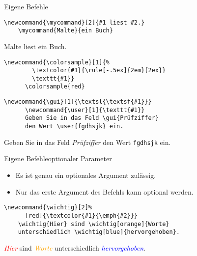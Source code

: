 \begin{Frame}[fragile]{Eigene Befehle}
  \begin{lstlisting}[gobble=4,moretexcs={mycommand}]
    \newcommand{\mycommand}[2]{#1 liest #2.}
    \mycommand{Malte}{ein Buch}
  \end{lstlisting}
  \newcommand{\mycommand}[2]{#1 liest #2.}
  \mycommand{Malte}{ein Buch}

  \xxx\pause

  \begin{Beispiel}
    \begin{lstlisting}[gobble=6,style=block,moretexcs={colorsample}]
      \newcommand{\colorsample}[1]{%
        \textcolor{#1}{\rule[-.5ex]{2em}{2ex}}
        \texttt{#1}}
      \colorsample{red}
    \end{lstlisting}
  \end{Beispiel}

  \pause

  \begin{Beispiel}
    \begin{lstlisting}[gobble=6,style=block,moretexcs={user,gui}]
      \newcommand{\gui}[1]{\textsl{\textsf{#1}}}
      \newcommand{\user}[1]{\texttt{#1}}
      Geben Sie in das Feld \gui{Prüfziffer}
      den Wert \user{fgdhsjk} ein.
    \end{lstlisting}
    \newcommand{\gui}[1]{\textsl{\textsf{#1}}}
    \newcommand{\user}[1]{\texttt{#1}}
    \textrm{Geben Sie in das Feld \gui{Prüfziffer}
    den Wert \user{fgdhsjk} ein.}
  \end{Beispiel}
\end{Frame}

\begin{Frame}[fragile]{Eigene Befehle}{optionaler Parameter}
  \begin{itemize}
    \item Es ist \alert{genau ein} optionales Argument zulässig.
    \item Nur das \alert{erste Argument} des Befehls kann optional werden.
  \end{itemize}

  \xxx

  \begin{lstlisting}[gobble=4,moretexcs={wichtig}]
    \newcommand{\wichtig}[2]%
      [red]{\textcolor{#1}{\emph{#2}}}
    \wichtig{Hier} sind \wichtig[orange]{Worte}
    unterschiedlich \wichtig[blue]{hervorgehoben}.
  \end{lstlisting}
  \newcommand{\wichtig}[2]%
    [red]{\textcolor{#1}{\emph{#2}}}
  \wichtig{Hier} sind \wichtig[orange]{Worte}
  unterschiedlich \wichtig[blue]{hervorgehoben}.
\end{Frame}


